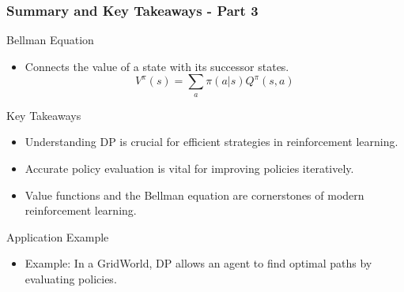 \documentclass[aspectratio=169]{beamer}
\begin{document}
\begin{frame}[fragile]
    \frametitle{Summary and Key Takeaways - Part 3}

    \begin{block}{Bellman Equation}
        \begin{itemize}
            \item Connects the value of a state with its successor states.
            \begin{equation}
                V^{\pi}(s) = \sum_{a} \pi(a|s) Q^{\pi}(s, a)
            \end{equation}
        \end{itemize}
    \end{block}
    
    \begin{block}{Key Takeaways}
        \begin{itemize}
            \item Understanding DP is crucial for efficient strategies in reinforcement learning.
            \item Accurate policy evaluation is vital for improving policies iteratively.
            \item Value functions and the Bellman equation are cornerstones of modern reinforcement learning.
        \end{itemize}
    \end{block}
    
    \begin{block}{Application Example}
        \begin{itemize}
            \item Example: In a GridWorld, DP allows an agent to find optimal paths by evaluating policies.
        \end{itemize}
    \end{block}
\end{frame}
\end{document}
